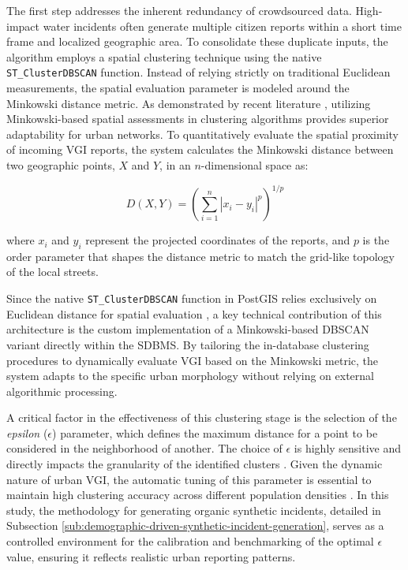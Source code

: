 \documentclass[conference]{IEEEtran}
\renewcommand\hl[1]{#1}
\begin{document}
The first step addresses the inherent redundancy of crowdsourced data. High-impact water incidents often generate multiple citizen reports within a short time frame and localized geographic area. To consolidate these duplicate inputs, the algorithm employs a spatial clustering technique using the native \texttt{ST\_ClusterDBSCAN} function. Instead of relying strictly on traditional Euclidean measurements, the spatial evaluation parameter is modeled around the Minkowski distance metric. As demonstrated by recent literature \cite{haviluddin2020, karo2025}, utilizing Minkowski-based spatial assessments in clustering algorithms provides superior adaptability for urban networks. \hl{To quantitatively evaluate the spatial proximity of incoming VGI reports, the system calculates} the Minkowski distance between two \hl{geographic} points, $X$ and $Y$, in an $n$-dimensional space \hl{as:}

\begin{equation}
	D(X, Y) = \left( \sum_{i=1}^{n} |x_i - y_i|^p \right)^{1/p}
	\label{eq:minkowski}
\end{equation}

\hl{where $x_i$ and $y_i$ represent the projected coordinates of the reports, and $p$ is the order parameter that shapes the distance metric to match the grid-like topology of the local streets.}

\hl{Since the native \texttt{ST\_ClusterDBSCAN} function in PostGIS relies exclusively on Euclidean distance for spatial evaluation \cite{obe2021}, a key technical contribution of this architecture is the custom implementation of a Minkowski-based DBSCAN variant directly within the SDBMS. By tailoring the in-database clustering procedures to dynamically evaluate VGI based on the Minkowski metric, the system adapts to the specific urban morphology without relying on external algorithmic processing.}

A critical factor in the effectiveness of this clustering stage is the selection of the \textit{epsilon} ($\epsilon$) parameter, which defines the maximum distance for a point to be considered in the neighborhood of another. The choice of $\epsilon$ is highly sensitive and directly impacts the granularity of the identified clusters \cite{rahmah2020}. Given the dynamic nature of urban VGI, the automatic tuning of this parameter is essential to maintain high clustering accuracy across different population densities \cite{starczewski2020}. In this study, the methodology for generating organic synthetic incidents, detailed in Subsection \ref{sub:demographic-driven-synthetic-incident-generation}, serves as a controlled environment for the calibration and benchmarking of the optimal $\epsilon$ value, ensuring it reflects realistic urban reporting patterns.
\end{document}
